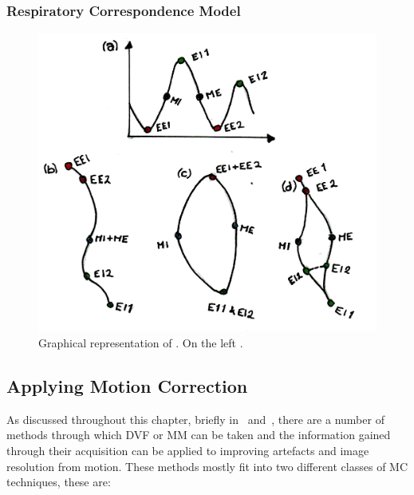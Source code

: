             \subsubsection{Respiratory Correspondence Model} \label{sec:respiratory_correspondence_model}
                \begin{figure}
                    \centering
                            
                    \includegraphics[width=1.0\linewidth]{figures/background_rcm.png}
                            
                    \captionsetup{singlelinecheck=false, justification=raggedright}
                    \caption{Graphical representation of . On the left .} \label{fig:motion_modelling_rcm}
                \end{figure}
                
        
        \subsection{Applying Motion Correction} \label{sec:applying_motion_correction}
            As discussed throughout this chapter, briefly in~ and~, there are a number of methods through which \gls{DVF} or \gls{MM} can be taken and the information gained through their acquisition can be applied to improving artefacts and image resolution from motion. These methods mostly fit into two different classes of \gls{MC} techniques, these are:
            
